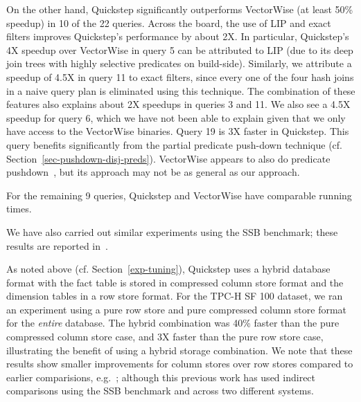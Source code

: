 On the other hand, Quickstep significantly outperforms VectorWise (at least 50\% speedup) in 10 of the 22 queries. Across the board, the use of LIP and exact filters improves Quickstep's performance by about 2X. In particular, Quickstep's 4X speedup over VectorWise in query 5 can be attributed to LIP (due to its deep join trees with highly selective predicates on build-side). Similarly, we attribute a speedup of 4.5X in query 11 to exact filters, since every one of the four hash joins in a naive query plan is eliminated using this technique. The combination of these features also explains about 2X speedups in queries 3 and 11. We also see a 4.5X speedup for query 6, which we have not been able to explain given that we only have access to the VectorWise binaries. Query 19 is 3X faster in Quickstep. This query benefits significantly from the partial predicate push-down technique  (cf. Section~\ref{sec-pushdown-disj-preds}). VectorWise appears to also do predicate pushdown~\cite{BonczNE13}, but its approach may not be as general as our approach.

For the remaining 9 queries, Quickstep and VectorWise have comparable running times.

We have also carried out similar experiments using the SSB benchmark; these results are reported in~\cite{patel1quickstep}.

As noted above (cf. Section~\ref{exp-tuning}), Quickstep uses a hybrid database format with the fact table is stored in compressed column store format and the dimension tables in a row store format. For the TPC-H SF 100 dataset, we ran an experiment using a pure row store and pure compressed column store format for the \textit{entire} database. The hybrid combination was 40\% faster than the pure compressed column store case, and 3X faster than the pure row store case, illustrating the benefit of using a hybrid storage combination. We note that these results show smaller improvements for column stores over row stores compared to earlier comparisions, e.g.~\cite{DBLP:conf/sigmod/AbadiMH08}; although this previous work has used indirect comparisons using the SSB benchmark and across two different systems.


